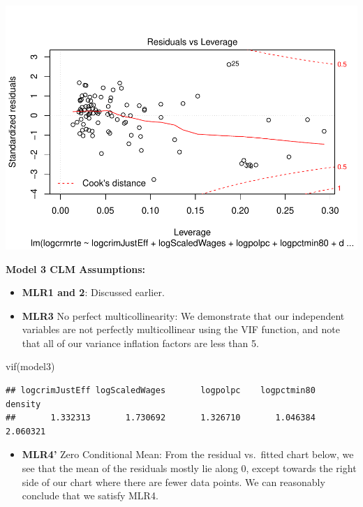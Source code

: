 \documentclass[]{article}
\newenvironment{Shaded}{}{}
\newcommand{\KeywordTok}[1]{\textcolor[rgb]{0.00,0.00,1.00}{#1}}
\newcommand{\NormalTok}[1]{#1}
\providecommand{\tightlist}{%
  \setlength{\itemsep}{0pt}\setlength{\parskip}{0pt}}
\begin{document}
\includegraphics{Bagnard_Gaustad_Hartman_Leung_Lab_3_files/figure-latex/unnamed-chunk-83-1.pdf}

\textbf{Model 3 CLM Assumptions:}

\begin{itemize}
\item
  \textbf{MLR1 and 2}: Discussed earlier.
\item
  \textbf{MLR3} No perfect multicollinearity: We demonstrate that our
  independent variables are not perfectly multicollinear using the VIF
  function, and note that all of our variance inflation factors are less
  than 5.
\end{itemize}

\begin{Shaded}
\begin{Highlighting}[]
\KeywordTok{vif}\NormalTok{(model3)}
\end{Highlighting}
\end{Shaded}

\begin{verbatim}
## logcrimJustEff logScaledWages       logpolpc    logpctmin80        density 
##       1.332313       1.730692       1.326710       1.046384       2.060321
\end{verbatim}

\begin{itemize}
\tightlist
\item
  \textbf{MLR4'} Zero Conditional Mean: From the residual vs.~fitted
  chart below, we see that the mean of the residuals mostly lie along 0,
  except towards the right side of our chart where there are fewer data
  points. We can reasonably conclude that we satisfy MLR4.
\end{itemize}
\end{document}
